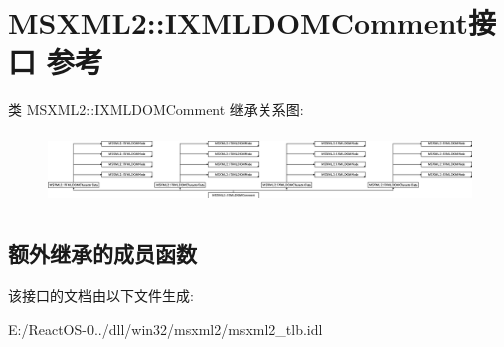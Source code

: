 \hypertarget{interface_m_s_x_m_l2_1_1_i_x_m_l_d_o_m_comment}{}\section{M\+S\+X\+M\+L2\+:\+:I\+X\+M\+L\+D\+O\+M\+Comment接口 参考}
\label{interface_m_s_x_m_l2_1_1_i_x_m_l_d_o_m_comment}
类 M\+S\+X\+M\+L2\+:\+:I\+X\+M\+L\+D\+O\+M\+Comment 继承关系图\+:\begin{figure}[H]
\begin{center}
\leavevmode
\includegraphics[height=1.891892cm]{interface_m_s_x_m_l2_1_1_i_x_m_l_d_o_m_comment}
\end{center}
\end{figure}
\subsection*{额外继承的成员函数}


该接口的文档由以下文件生成\+:\begin{DoxyCompactItemize}
\item 
E\+:/\+React\+O\+S-\/0../dll/win32/msxml2/msxml2\+\_\+tlb.\+idl\end{DoxyCompactItemize}
